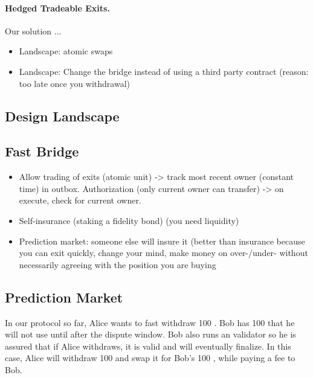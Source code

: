 \paragraph{Hedged Tradeable Exits.} Our solution ...

 

\begin{itemize}
\item Landscape: atomic swaps
\item Landscape: Change the bridge instead of using a third party contract (reason: too late once you withdrawal)
\end{itemize}

\subsection{Design Landscape}


\subsection{Fast Bridge} 

\begin{itemize}
\item Allow trading of exits (atomic unit) -> track most recent owner (constant time) in outbox. Authorization (only current owner can transfer) -> on execute, check for current owner. 
\item Self-insurance (staking a fidelity bond) (you need liquidity) 
\item Prediction market: someone else will insure it (better than insurance because you can exit quickly, change your mind, make money on over-/under- without necessarily agreeing with the position you are buying
\end{itemize}

\subsection{Prediction Market}

In our protocol so far, Alice wants to fast withdraw 100 \ethtwo. Bob has 100 \ethone that he will not use until after the dispute window. Bob also runs an \layertwo validator so he is assured that if Alice withdraws, it is valid and will eventually finalize. In this case, Alice will withdraw 100 \ethxx and swap it for Bob's 100 \ethone, while paying a fee to Bob. 

